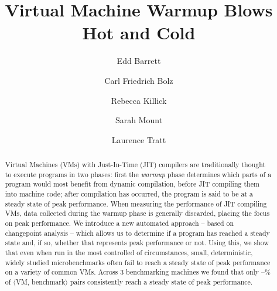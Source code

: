 \documentclass[acmlarge]{acmart}\settopmatter{printfolios=true}
\newcommand{\vmbpair}{$\langle$VM, benchmark$\rangle$\xspace}
\begin{document}
\title{Virtual Machine Warmup Blows Hot and Cold}

\author{Edd Barrett}
\author{Carl Friedrich Bolz}
\author{Rebecca Killick}
\author{Sarah Mount}
\author{Laurence Tratt}

%
%
%

\begin{abstract}
Virtual Machines (VMs) with Just-In-Time (JIT) compilers are traditionally thought
to execute programs in two phases: first the \emph{warmup} phase determines
which parts of a program would most benefit from dynamic compilation, before JIT
compiling them into machine code; after
compilation has occurred, the program is said to be at a steady state of peak performance.
When measuring the performance of JIT compiling VMs, data collected
during the warmup phase is generally discarded, placing the focus on peak
performance. We introduce a new automated approach -- based
on changepoint analysis -- which allows us to determine if a program
has reached a steady state and, if so, whether that represents peak
performance or not. Using this, we show that even when run in the
most controlled of circumstances, small, deterministic, widely studied
microbenchmarks often fail to reach a steady state of peak performance on a
variety of common VMs. Across 3 benchmarking machines we found that only \mintwo--\maxtwo\% of
\vmbpair pairs consistently reach a steady state of peak performance.
\end{abstract}
\end{document}
